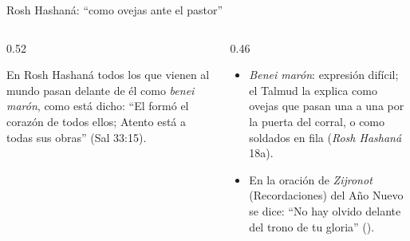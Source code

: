 \begin{frame}{Rosh Hashaná: ``como ovejas ante el pastor''}
\begin{columns}[t,onlytextwidth]
\begin{column}{0.52\textwidth}
\begin{cita}En Rosh Hashaná todos los que vienen al mundo pasan delante de él como \emph{benei marón}, como está dicho: ``El formó el corazón de todos ellos; Atento está a todas sus obras'' (Sal 33:15).\end{cita}
\begin{center}\end{center}
\end{column}
\begin{column}{0.46\textwidth}\small
\begin{itemize}
\item \emph{Benei marón}: expresión difícil; el Talmud la explica como ovejas que pasan una a una por la puerta del corral, o como soldados en fila (\emph{Rosh Hashaná} 18a).
\item En la oración de \emph{Zijronot} (Recordaciones) del Año Nuevo se dice: ``No hay olvido delante del trono de tu gloria'' ().
\end{itemize}
\end{column}
\end{columns}
\end{frame}

